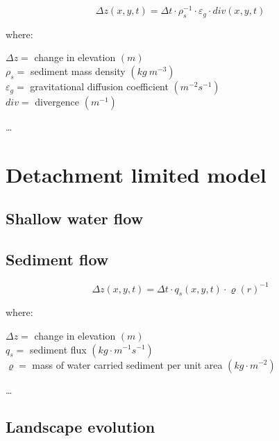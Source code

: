 \documentclass[final,3p,times,twocolumn]{elsarticle}
\begin{document}

\begin{equation}
\label{eq:grav_diffusion} 
{\Delta z(x,y,t) = \Delta t \cdot \rho_s^{-1} \cdot \varepsilon_g \cdot div(x,y,t)}
\end{equation}

\noindent
where: 

\noindent
$\Delta z =$ change in elevation $(m)$ \\
$\rho_s =$ sediment mass density $(kg ~m^{-3})$ \\
$\varepsilon_g =$ gravitational diffusion coefficient $(m^{-2} s^{-1})$ \\
$div =$ divergence $(m^{-1})$ \\
\vspace{1em}

\ldots
\cite{Thaxton2004}

\section{Detachment limited model} \label{flux_model}
\subsection{Shallow water flow}
\subsection{Sediment flow}


\begin{equation}
\label{eq:flux_evolution} 
{\Delta z(x,y,t)} = \Delta t \cdot q_s(x,y,t) \cdot \varrho(r)^{-1}
\end{equation}

\noindent
where: 

\noindent
$\Delta z =$ change in elevation $(m)$ \\
$q_s =$ sediment flux $(kg \cdot m^{-1} s^{-1})$ \\
$\varrho =$ mass of water carried sediment per unit area $(kg \cdot m^{-2})$ \\
\vspace{1em}

\ldots
\cite{mitasova2013}

\subsection{Landscape evolution}
\end{document}
